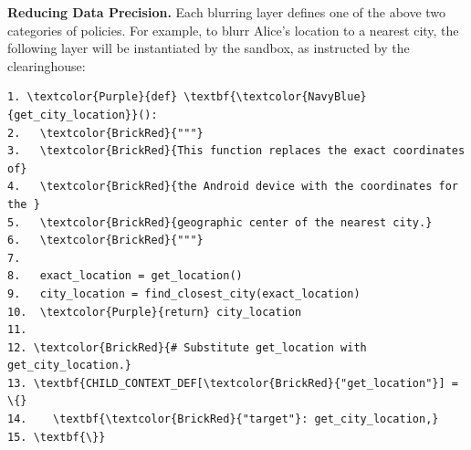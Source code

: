 
%
\textbf{Reducing Data Precision.}
Each blurring layer defines one of the above two categories of policies. 
For example, to blurr Alice's location to a nearest city, the following layer
will be instantiated by the sandbox, as instructed by the clearinghouse:

\begin{Verbatim}
1. \textcolor{Purple}{def} \textbf{\textcolor{NavyBlue}{get_city_location}}():
2.   \textcolor{BrickRed}{"""}
3.   \textcolor{BrickRed}{This function replaces the exact coordinates of} 
4.   \textcolor{BrickRed}{the Android device with the coordinates for the } 
5.   \textcolor{BrickRed}{geographic center of the nearest city.}
6.   \textcolor{BrickRed}{"""}
7.
8.   exact_location = get_location()
9.   city_location = find_closest_city(exact_location)
10.  \textcolor{Purple}{return} city_location
11.
12. \textcolor{BrickRed}{# Substitute get_location with get_city_location.}
13. \textbf{CHILD_CONTEXT_DEF[\textcolor{BrickRed}{"get_location"}] = \{}
14.    \textbf{\textcolor{BrickRed}{"target"}: get_city_location,}
15. \textbf{\}}
\end{Verbatim}

